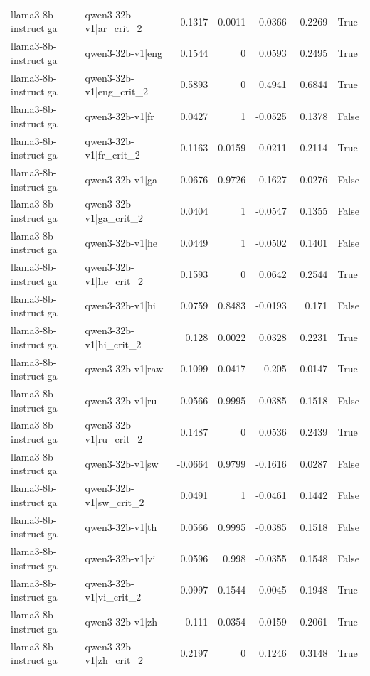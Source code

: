 \begin{table}
\begin{tabular}{l l r r r r l}
llama3-8b-instruct|ga & qwen3-32b-v1|ar_crit_2 & 0.1317 & 0.0011 & 0.0366 & 0.2269 & True \\
llama3-8b-instruct|ga & qwen3-32b-v1|eng & 0.1544 & 0 & 0.0593 & 0.2495 & True \\
llama3-8b-instruct|ga & qwen3-32b-v1|eng_crit_2 & 0.5893 & 0 & 0.4941 & 0.6844 & True \\
llama3-8b-instruct|ga & qwen3-32b-v1|fr & 0.0427 & 1 & -0.0525 & 0.1378 & False \\
llama3-8b-instruct|ga & qwen3-32b-v1|fr_crit_2 & 0.1163 & 0.0159 & 0.0211 & 0.2114 & True \\
llama3-8b-instruct|ga & qwen3-32b-v1|ga & -0.0676 & 0.9726 & -0.1627 & 0.0276 & False \\
llama3-8b-instruct|ga & qwen3-32b-v1|ga_crit_2 & 0.0404 & 1 & -0.0547 & 0.1355 & False \\
llama3-8b-instruct|ga & qwen3-32b-v1|he & 0.0449 & 1 & -0.0502 & 0.1401 & False \\
llama3-8b-instruct|ga & qwen3-32b-v1|he_crit_2 & 0.1593 & 0 & 0.0642 & 0.2544 & True \\
llama3-8b-instruct|ga & qwen3-32b-v1|hi & 0.0759 & 0.8483 & -0.0193 & 0.171 & False \\
llama3-8b-instruct|ga & qwen3-32b-v1|hi_crit_2 & 0.128 & 0.0022 & 0.0328 & 0.2231 & True \\
llama3-8b-instruct|ga & qwen3-32b-v1|raw & -0.1099 & 0.0417 & -0.205 & -0.0147 & True \\
llama3-8b-instruct|ga & qwen3-32b-v1|ru & 0.0566 & 0.9995 & -0.0385 & 0.1518 & False \\
llama3-8b-instruct|ga & qwen3-32b-v1|ru_crit_2 & 0.1487 & 0 & 0.0536 & 0.2439 & True \\
llama3-8b-instruct|ga & qwen3-32b-v1|sw & -0.0664 & 0.9799 & -0.1616 & 0.0287 & False \\
llama3-8b-instruct|ga & qwen3-32b-v1|sw_crit_2 & 0.0491 & 1 & -0.0461 & 0.1442 & False \\
llama3-8b-instruct|ga & qwen3-32b-v1|th & 0.0566 & 0.9995 & -0.0385 & 0.1518 & False \\
llama3-8b-instruct|ga & qwen3-32b-v1|vi & 0.0596 & 0.998 & -0.0355 & 0.1548 & False \\
llama3-8b-instruct|ga & qwen3-32b-v1|vi_crit_2 & 0.0997 & 0.1544 & 0.0045 & 0.1948 & True \\
llama3-8b-instruct|ga & qwen3-32b-v1|zh & 0.111 & 0.0354 & 0.0159 & 0.2061 & True \\
llama3-8b-instruct|ga & qwen3-32b-v1|zh_crit_2 & 0.2197 & 0 & 0.1246 & 0.3148 & True \\

\end{tabular}
\end{table}
